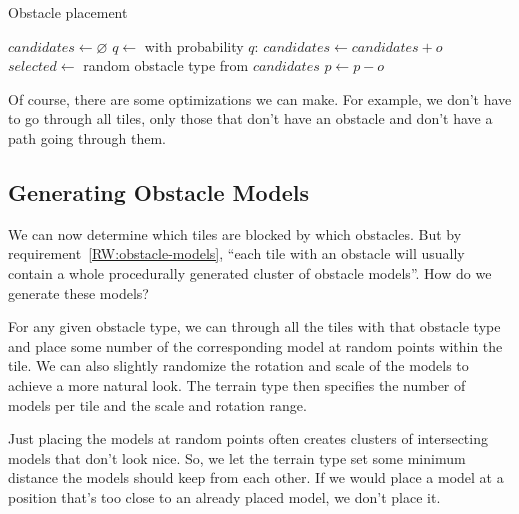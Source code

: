 \begin{algorithm}[H]
    \caption{Obstacle placement}
    \label{alg:obstacle-placement}
    \begin{algorithmic}[1]
        \Statex
        \State $candidates \gets \varnothing$
        \State $q \gets$ 
        \State with probability $q$: $candidates \gets candidates + o$
        \EndFor
        \Statex
        \State $selected \gets$ random obstacle type from $candidates$
        \State {}
        \EndIf
        \EndFor
        \Statex
        \State $p \gets p - o$
        \EndIf
        \EndFor
        \Statex
        \EndWhile
        \EndFor
        \Statex
    \end{algorithmic}
\end{algorithm}

Of course, there are some optimizations we can make.
For example, we don't have to go through all tiles, only those that don't have an obstacle and don't have a path going through them.

\subsection{Generating Obstacle Models}

We can now determine which tiles are blocked by which obstacles.
But by requirement~\ref{RW:obstacle-models}, \enquote{each tile with an obstacle will usually contain a whole procedurally generated cluster of obstacle models}.
How do we generate these models?

For any given obstacle type, we can through all the tiles with that obstacle type and place some number of the corresponding model at random points within the tile.
We can also slightly randomize the rotation and scale of the models to achieve a more natural look.
The terrain type then specifies the number of models per tile and the scale and rotation range.

Just placing the models at random points often creates clusters of intersecting models that don't look nice.
So, we let the terrain type set some minimum distance the models should keep from each other.
If we would place a model at a position that's too close to an already placed model, we don't place it.

